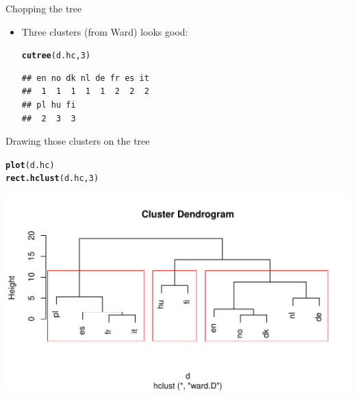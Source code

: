 \documentclass[unknownkeysallowed]{beamer}\usepackage[]{graphicx}\usepackage[]{color}
\makeatletter
\def\maxwidth{ %
  \ifdim\Gin@nat@width>\linewidth
    \linewidth
  \else
    \Gin@nat@width
  \fi
}
\newcommand{\hlnum}[1]{\textcolor[rgb]{0.686,0.059,0.569}{#1}}%
\newcommand{\hlstd}[1]{\textcolor[rgb]{0.345,0.345,0.345}{#1}}%
\newcommand{\hlkwd}[1]{\textcolor[rgb]{0.737,0.353,0.396}{\textbf{#1}}}%
\newenvironment{kframe}{%
 \def\at@end@of@kframe{}%
 \ifinner\ifhmode%
  \def\at@end@of@kframe{\end{minipage}}%
  \begin{minipage}{\columnwidth}%
 \fi\fi%
 \def\FrameCommand##1{\hskip\@totalleftmargin \hskip-\fboxsep
 \colorbox{shadecolor}{##1}\hskip-\fboxsep
     \hskip-\linewidth \hskip-\@totalleftmargin \hskip\columnwidth}%
 \MakeFramed {\advance\hsize-\width
   \@totalleftmargin\z@ \linewidth\hsize
   \@setminipage}}%
 {\par\unskip\endMakeFramed%
 \at@end@of@kframe}
\newenvironment{knitrout}{}{} %
\makeatother
\begin{document}
\begin{frame}[fragile]{Chopping the tree}

  \begin{itemize}
  \item Three clusters (from Ward) looks good:
\begin{knitrout}
\color{fgcolor}\begin{kframe}
\begin{alltt}
\hlkwd{cutree}\hlstd{(d.hc,}\hlnum{3}\hlstd{)}
\end{alltt}
\begin{verbatim}
## en no dk nl de fr es it 
##  1  1  1  1  1  2  2  2 
## pl hu fi 
##  2  3  3
\end{verbatim}
\end{kframe}
\end{knitrout}
  \end{itemize}
  
\end{frame}

\begin{frame}[fragile]{Drawing those clusters on the tree}
  
\begin{knitrout}
\color{fgcolor}\begin{kframe}
\begin{alltt}
\hlkwd{plot}\hlstd{(d.hc)}
\hlkwd{rect.hclust}\hlstd{(d.hc,}\hlnum{3}\hlstd{)}
\end{alltt}
\end{kframe}
\includegraphics[width=\maxwidth]{figure/asfsagd-1} 

\end{knitrout}
  
\end{frame}
\end{document}

